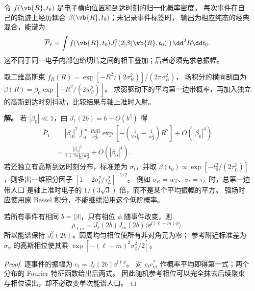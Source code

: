 \begin{definition}
令 $f(\vb{R},t_0)$ 是电子横向位置和到达时刻的归一化概率密度。
每次事件在自己的轨迹上经历耦合 $\beta(\vb{R},t_0)$；未记录事件标签时，
输出为相应纯态的经典混合，能谱为
\begin{equation}
\overline P_\ell=\int f(\vb{R},t_0)
J_\ell^2(2|\beta(\vb{R},t_0)|)\,\dd^2R\dd t_0.
\label{eq:feqo-ensemble-pinem}
\end{equation}
\label{chap:feqo-averaging}
这不同于同一电子内部包络切片之间的相干叠加；后者必须先求总振幅。
\end{definition}

\begin{exbox}[束腰与光脉冲宽度怎样改变边带人口]
取二维高斯束 $f_R(R)=\exp[-R^2/(2\sigma_R^2)]/(2\pi\sigma_R^2)$，
场积分的横向剖面为 $\beta(R)=\beta_0\exp[-R^2/(2w_\beta^2)]$。
求弱驱动下的平均第一边带概率，再加入独立的高斯到达时刻抖动，比较结果与轴上准时入射。

\textbf{解。} 若 $|\beta_0|\ll1$，由 $J_1(2b)=b+O(b^3)$ 得
\begin{align*}
\overline P_1&=|\beta_0|^2\int_0^\infty
\frac{R\dd R}{\sigma_R^2}
\exp\left[-\left(\frac1{2\sigma_R^2}+\frac1{w_\beta^2}\right)R^2\right]
+O(|\beta_0|^4)\\
&=\frac{|\beta_0|^2}{1+2\sigma_R^2/w_\beta^2}+O(|\beta_0|^4).
\end{align*}
若还独立有高斯到达时刻分布，标准差为 $\sigma_t$，并取
$\beta(t_0)\propto\exp[-t_0^2/(2\tau_L^2)]$，则多出一维积分因子
$[1+2\sigma_t^2/\tau_L^2]^{-1/2}$。
例如 $\sigma_R=w_\beta$、$\sigma_t=\tau_L$ 时，总第一边带人口
是轴上准时电子的 $1/(3\sqrt3)$ 倍，而不是某个平均振幅的平方。
强场时应使用原 Bessel 积分，不能继续沿用这个低阶概率。
\end{exbox}

\begin{proposition}[强度平均与参考相位平均读取不同态分量]
若所有事件有相同 $b=|\beta|$，只有相位 $\phi$ 随事件改变，则
\[
\overline\rho_{\ell m}=J_\ell(2b)J_m(2b)
\langle\ee^{\ii(\ell-m)\phi}\rangle.
\]
所以能谱保持 $J_\ell^2(2b)$。圆周均匀相位使所有非对角元为零；
参考附近标准差为 $\sigma_\phi$ 的高斯相位使其乘
$\exp[-(\ell-m)^2\sigma_\phi^2/2]$。
\end{proposition}
\begin{proof}
逐事件的振幅为 $c_\ell=J_\ell(2b)\ee^{\ii\ell\phi}$。
对 $c_\ell c_m^*$ 作概率平均即得第一式；两个分布的 Fourier 特征函数给出后两式。
因此随机参考相位可以完全抹去后续聚束与相位读出，却不必改变单次能谱人口。
\end{proof}
